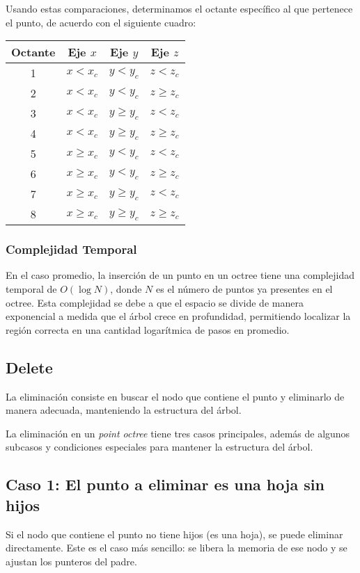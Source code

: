 \documentclass{article}
\begin{document}
Usando estas comparaciones, determinamos el octante específico al que pertenece el punto, de acuerdo con el siguiente cuadro:

\begin{center}
    \begin{tabular}{c|c|c|c}
        Octante & Eje \(x\) & Eje \(y\) & Eje \(z\) \\
        \hline
        1 & \(x < x_c\) & \(y < y_c\) & \(z < z_c\) \\
        2 & \(x < x_c\) & \(y < y_c\) & \(z \geq z_c\) \\
        3 & \(x < x_c\) & \(y \geq y_c\) & \(z < z_c\) \\
        4 & \(x < x_c\) & \(y \geq y_c\) & \(z \geq z_c\) \\
        5 & \(x \geq x_c\) & \(y < y_c\) & \(z < z_c\) \\
        6 & \(x \geq x_c\) & \(y < y_c\) & \(z \geq z_c\) \\
        7 & \(x \geq x_c\) & \(y \geq y_c\) & \(z < z_c\) \\
        8 & \(x \geq x_c\) & \(y \geq y_c\) & \(z \geq z_c\) \\
    \end{tabular}
\end{center}

\subsubsection{Complejidad Temporal}

En el caso promedio, la inserción de un punto en un octree tiene una complejidad temporal de \(O(\log N)\), donde \(N\) es el número de puntos ya presentes en el octree. Esta complejidad se debe a que el espacio se divide de manera exponencial a medida que el árbol crece en profundidad, permitiendo localizar la región correcta en una cantidad logarítmica de pasos en promedio.


\subsection{Delete}
La eliminación consiste en buscar el nodo que contiene el punto y eliminarlo de manera adecuada, manteniendo la estructura del árbol.

La eliminación en un \textit{point octree} tiene tres casos principales, además de algunos subcasos y condiciones especiales para mantener la estructura del árbol.

\subsection*{Caso 1: El punto a eliminar es una hoja sin hijos}
Si el nodo que contiene el punto no tiene hijos (es una hoja), se puede eliminar directamente. Este es el caso más sencillo: se libera la memoria de ese nodo y se ajustan los punteros del padre.
\end{document}
